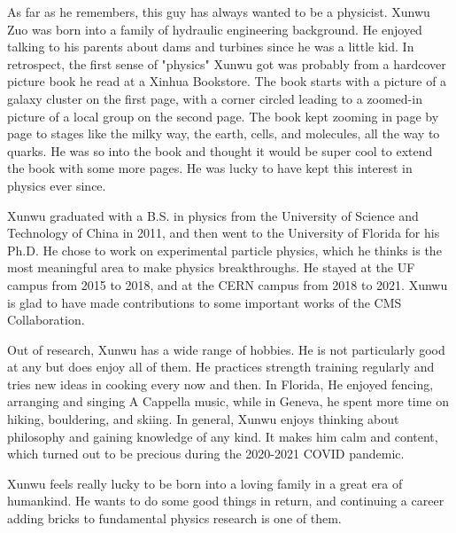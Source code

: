
\hspace{2em} As far as he remembers, this guy has always wanted to be a physicist.
Xunwu Zuo was born into a family of hydraulic engineering background.
He enjoyed talking to his parents about dams and turbines since he was a little kid.
In retrospect, the first sense of "physics" Xunwu got was probably from a hardcover picture book he read at a Xinhua Bookstore.
The book starts with a picture of a galaxy cluster on the first page, 
with a corner circled leading to a zoomed-in picture of a local group on the second page.
The book kept zooming in page by page to stages like the milky way, the earth, cells, and molecules, all the way to quarks.
He was so into the book and thought it would be super cool to extend the book with some more pages.
He was lucky to have kept this interest in physics ever since.

Xunwu graduated with a B.S. in physics from the University of Science and Technology of China in 2011,
and then went to the University of Florida for his Ph.D.
He chose to work on experimental particle physics, 
which he thinks is the most meaningful area to make physics breakthroughs.
He stayed at the UF campus from 2015 to 2018, and at the CERN campus from 2018 to 2021.
Xunwu is glad to have made contributions to some important works of the CMS Collaboration.

Out of research, Xunwu has a wide range of hobbies.
He is not particularly good at any but does enjoy all of them.
He practices strength training regularly and tries new ideas in cooking every now and then.
In Florida, He enjoyed fencing, arranging and singing A Cappella music,
while in Geneva, he spent more time on hiking, bouldering, and skiing.
In general, Xunwu enjoys thinking about philosophy and gaining knowledge of any kind.
It makes him calm and content, which turned out to be precious during the 2020-2021 COVID pandemic.

Xunwu feels really lucky to be born into a loving family in a great era of humankind.
He wants to do some good things in return,
and continuing a career adding bricks to fundamental physics research is one of them.